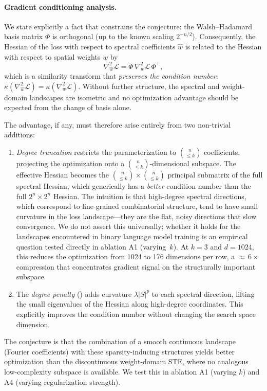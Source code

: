 \documentclass[12pt,a4paper]{article}
\theoremstyle{plain}
\theoremstyle{definition}
\theoremstyle{remark}
\newcommand{\what}{\widehat{w}}
\begin{document}
\paragraph{Gradient conditioning analysis.}
We state explicitly a fact that constrains the conjecture: the Walsh--Hadamard basis matrix $\Phi$ is orthogonal (up to the known scaling $2^{-n/2}$).
Consequently, the Hessian of the loss with respect to spectral coefficients $\what$ is related to the Hessian with respect to spatial weights $w$ by
\[
    \nabla^2_{\what}\mathcal{L} = \Phi \,\nabla^2_w \mathcal{L}\, \Phi^\top,
\]
which is a similarity transform that \emph{preserves the condition number}: $\kappa(\nabla^2_{\what}\mathcal{L}) = \kappa(\nabla^2_w \mathcal{L})$.
Without further structure, the spectral and weight-domain landscapes are isometric and no optimization advantage should be expected from the change of basis alone.

The advantage, if any, must therefore arise entirely from two non-trivial additions:
\begin{enumerate}[label=(\roman*)]
    \item \emph{Degree truncation} restricts the parameterization to $\binom{n}{\leq k}$ coefficients, projecting the optimization onto a $\binom{n}{\leq k}$-dimensional subspace. The effective Hessian becomes the $\binom{n}{\leq k} \times \binom{n}{\leq k}$ principal submatrix of the full spectral Hessian, which generically has a \emph{better} condition number than the full $2^n \times 2^n$ Hessian. The intuition is that high-degree spectral directions, which correspond to fine-grained combinatorial structure, tend to have small curvature in the loss landscape---they are the flat, noisy directions that slow convergence. We do not assert this universally; whether it holds for the landscapes encountered in binary language model training is an empirical question tested directly in ablation A1 (varying~$k$). At $k = 3$ and $d = 1024$, this reduces the optimization from 1024 to 176 dimensions per row, a ${\approx}\,6\times$ compression that concentrates gradient signal on the structurally important subspace.
    \item The \emph{degree penalty} () adds curvature $\lambda |S|^p$ to each spectral direction, lifting the small eigenvalues of the Hessian along high-degree coordinates. This explicitly improves the condition number without changing the search space dimension.
\end{enumerate}
The conjecture is that the combination of a smooth continuous landscape (Fourier coefficients) with these sparsity-inducing structures yields better optimization than the discontinuous weight-domain STE, where no analogous low-complexity subspace is available. We test this in ablation A1 (varying $k$) and A4 (varying regularization strength).
\end{document}
